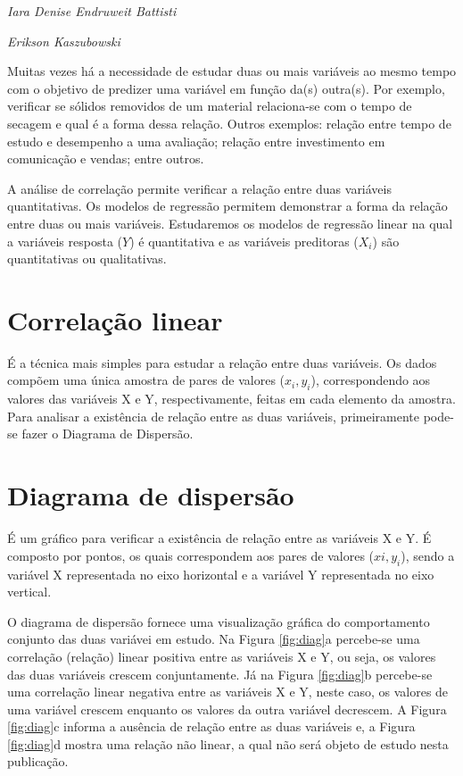 \documentclass[12pt,brazil,oneside]{book}
\begin{document}
\emph{Iara Denise Endruweit Battisti}

\emph{Erikson Kaszubowski}

Muitas vezes há a necessidade de estudar duas ou mais variáveis ao mesmo tempo com o objetivo de predizer uma variável em função da(s) outra(s). Por exemplo, verificar se sólidos removidos de um material relaciona-se com o tempo de secagem e qual é a forma dessa relação. Outros exemplos: relação entre tempo de estudo e desempenho a uma avaliação; relação entre investimento em comunicação e vendas; entre outros.

A análise de correlação permite verificar a relação entre duas variáveis quantitativas. Os modelos de regressão permitem demonstrar a forma da relação entre duas ou mais variáveis. Estudaremos os modelos de regressão linear na qual a variáveis resposta (\(Y\)) é quantitativa e as variáveis preditoras (\(X_i\)) são quantitativas ou qualitativas.

\hypertarget{correlacao-linear}{%
\section{Correlação linear}\label{correlacao-linear}}

É a técnica mais simples para estudar a relação entre duas variáveis. Os dados compõem uma única amostra de pares de valores (\(x_i, y_i\)), correspondendo aos valores das variáveis X e Y, respectivamente, feitas em cada elemento da amostra. Para analisar a existência de relação entre as duas variáveis, primeiramente pode-se fazer o Diagrama de Dispersão.

\hypertarget{diagrama-de-dispersao}{%
\section{Diagrama de dispersão}\label{diagrama-de-dispersao}}

É um gráfico para verificar a existência de relação entre as variáveis X e Y. É composto por pontos, os quais correspondem aos pares de valores (\(xi, y_i\)), sendo a variável X representada no eixo horizontal e a variável Y representada no eixo vertical.

O diagrama de dispersão fornece uma visualização gráfica do comportamento conjunto das duas variávei em estudo. Na Figura \ref{fig:diag}a percebe-se uma correlação (relação) linear positiva entre as variáveis X e Y, ou seja, os valores das duas variáveis crescem conjuntamente. Já na Figura \ref{fig:diag}b percebe-se uma correlação linear negativa entre as variáveis X e Y, neste caso, os valores de uma variável crescem enquanto os valores da outra variável decrescem. A Figura \ref{fig:diag}c informa a ausência de relação entre as duas variáveis e, a Figura \ref{fig:diag}d mostra uma relação não linear, a qual não será objeto de estudo nesta publicação.
\end{document}
